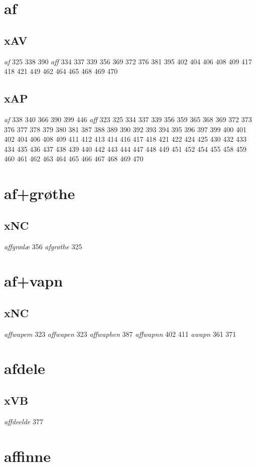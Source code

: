 \documentclass[a4paper,twocolumn]{article}
\begin{document}
\section{af}
\label{sec:org13b81f6}
\subsection{xAV}
\label{sec:org6b35b53}
\emph{af} 325 338 390 \emph{aff} 334 337 339 356 369 372 376 381 395 402 404 406 408 409 417 418 421 449 462 464 465 468 469 470 
\subsection{xAP}
\label{sec:orgc5553b1}
\emph{af} 338 340 366 390 399 446 \emph{aff} 323 325 334 337 339 356 359 365 368 369 372 373 376 377 378 379 380 381 387 388 389 390 392 393 394 395 396 397 399 400 401 402 404 406 408 409 411 412 413 414 416 417 418 421 422 424 425 430 432 433 434 435 436 437 438 439 440 442 443 444 447 448 449 451 452 454 455 458 459 460 461 462 463 464 465 466 467 468 469 470 
\section{af+grøthe}
\label{sec:orgd7e297a}
\subsection{xNC}
\label{sec:orge34d478}
\emph{affgrødæ} 356 \emph{afgrøthe} 325 
\section{af+vapn}
\label{sec:org0204043}
\subsection{xNC}
\label{sec:org2611a6b}
\emph{affwapem} 323 \emph{affwapen} 323 \emph{affwaphen} 387 \emph{affwapnn} 402 411 \emph{awapn} 361 371 
\section{afdele}
\label{sec:orgc773817}
\subsection{xVB}
\label{sec:org31a085e}
\emph{affdeelde} 377 
\section{affinne}
\label{sec:orgb358fa9}
\end{document}
